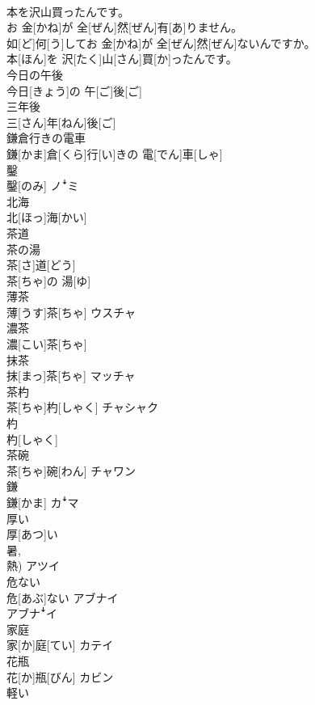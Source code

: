 \documentclass[8pt]{extreport}
\begin{document}
\begin{CJK}{UTF8}{min}
\\	本を沢山買ったんです。	
\\	お 金[かね]が 全[ぜん]然[ぜん]有[あ]りません。 
\\	如[ど]何[う]してお 金[かね]が 全[ぜん]然[ぜん]ないんですか。 
\\	本[ほん]を 沢[たく]山[さん]買[か]ったんです。
\\	今日の午後	
\\	今日[きょう]の 午[ご]後[ご]
\\	三年後	
\\	三[さん]年[ねん]後[ご]
\\	鎌倉行きの電車	
\\	鎌[かま]倉[くら]行[い]きの 電[でん]車[しゃ]
\\	鑿	
\\	鑿[のみ]	ノꜜミ
\\	北海	
\\	北[ほっ]海[かい]	
\\	茶道 
\\	茶の湯	
\\	茶[さ]道[どう] 
\\	茶[ちゃ]の 湯[ゆ]	
\\	薄茶	
\\	薄[うす]茶[ちゃ]	ウスチャ
\\	濃茶	
\\	濃[こい]茶[ちゃ]	
\\	抹茶	
\\	抹[まっ]茶[ちゃ]	マッチャ
\\	茶杓	
\\	茶[ちゃ]杓[しゃく]	チャシャク
\\	杓	
\\	杓[しゃく]	
\\	茶碗	
\\	茶[ちゃ]碗[わん]	チャワン
\\	鎌	
\\	鎌[かま]	カꜜマ
\\	厚い	
\\	厚[あつ]い 
\\	暑, 
\\	熱)	アツイ
\\	危ない	
\\	危[あぶ]ない	アブナイ 
\\	アブナꜜイ
\\	家庭	
\\	家[か]庭[てい]	カテイ
\\	花瓶	
\\	花[か]瓶[びん]	カビン
\\	軽い	

\end{CJK}
\end{document}
